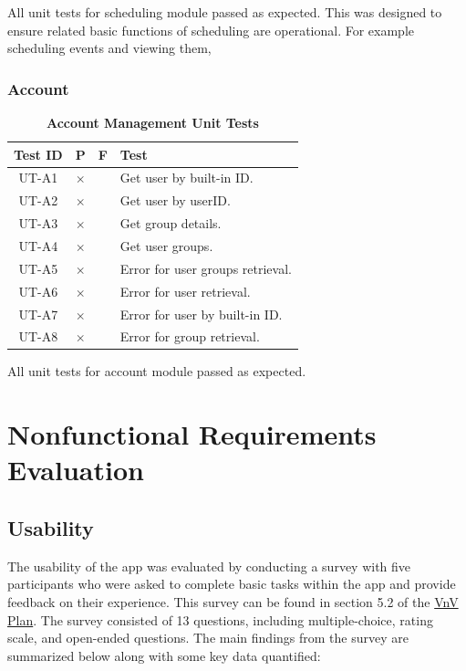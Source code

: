 \documentclass[12pt, titlepage]{article}
\begin{document}
All unit tests for scheduling module passed as expected. This was designed to ensure related basic functions of scheduling are operational. For example scheduling events and viewing them,

\subsubsection{Account}

\begin{table}[H]
\centering
\begin{tabular}{|c|c|c|p{5cm}|}
\hline
Test ID & P & F & Test\\
\hline 
UT-A1 & $\times$ & & Get user by built-in ID.\\
\hline 
UT-A2 & $\times$ & & Get user by userID.\\
\hline 
UT-A3 & $\times$ & & Get group details.\\
\hline 
UT-A4 & $\times$ & & Get user groups.\\
\hline 
UT-A5 & $\times$ & & Error for user groups retrieval.\\
\hline 
UT-A6 & $\times$ & & Error for user retrieval.\\
\hline 
UT-A7 & $\times$ & & Error for user by built-in ID.\\
\hline 
UT-A8 & $\times$ & & Error for group retrieval.\\
\hline
\end{tabular}
\caption{\bf Account Management Unit Tests}
\end{table}

All unit tests for account module passed as expected.


\section{Nonfunctional Requirements Evaluation}

\subsection{Usability}
The usability of the app was evaluated by conducting a survey with five participants who were asked to complete basic tasks within the app and provide feedback on their experience. This survey can be found in section 5.2 of the \href{https://github.com/DangJustin/CapstoneProject/blob/main/docs/VnVPlan/VnVPlan.pdf}{VnV Plan}. The survey consisted of 13 questions, including multiple-choice, rating scale, and open-ended questions. The main findings from the survey are summarized below along with some key data quantified:
\end{document}
